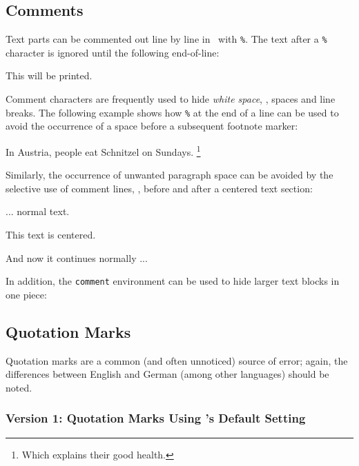 \subsection{Comments}
\label{sec:comments}

Text parts can be commented out line by line in \latex\ with \verb!%!. The text
after a \verb!%! character is ignored until the following end-of-line:
%
\begin{LaTeXCode}[numbers=none]
This will be printed. %
\end{LaTeXCode}
%
Comment characters are frequently used to hide \emph{white space}, \ie, spaces
and line breaks. The following example shows how \verb!%! at the end of a line
can be used to avoid the occurrence of a space before a subsequent footnote
marker:
%
\begin{LaTeXCode}[numbers=none]
In Austria, people eat Schnitzel on Sundays.%
\footnote{Which explains their good health.}
\end{LaTeXCode}
%
Similarly, the occurrence of unwanted paragraph space can be avoided by the
selective use of comment lines, \eg, before and after a centered text section:
%
\begin{LaTeXCode}[numbers=none]
... normal text.
%
\begin{center}
   This text is centered.
\end{center}
%
And now it continues normally ...
\end{LaTeXCode}
%
In addition, the \verb!comment! environment can be used to hide larger text blocks
in one piece:
\begin{LaTeXCode}[numbers=none]

\end{LaTeXCode}



\subsection{Quotation Marks}
\label{sec:quotation-marks}

Quotation marks are a common (and often unnoticed) source of error; again, the
differences between English and German (among other languages) should be noted.

\subsubsection{Version 1: Quotation Marks Using \latex's Default Setting}

